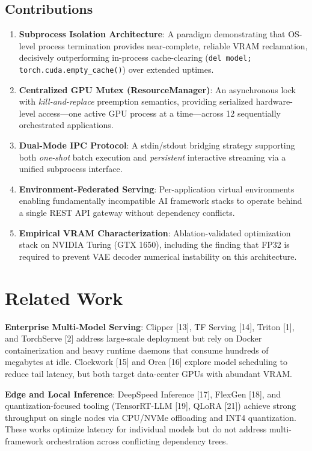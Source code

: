 \documentclass[conference]{IEEEtran}
\begin{document}
\subsection{Contributions}
\begin{enumerate}
    \item \textbf{Subprocess Isolation Architecture}: A paradigm demonstrating that OS-level process termination provides near-complete, reliable VRAM reclamation, decisively outperforming in-process cache-clearing (\texttt{del model; torch.cuda.empty\_cache()}) over extended uptimes.
    \item \textbf{Centralized GPU Mutex (ResourceManager)}: An asynchronous lock with \textit{kill-and-replace} preemption semantics, providing serialized hardware-level access---one active GPU process at a time---across 12 sequentially orchestrated applications.
    \item \textbf{Dual-Mode IPC Protocol}: A stdin/stdout bridging strategy supporting both \textit{one-shot} batch execution and \textit{persistent} interactive streaming via a unified subprocess interface.
    \item \textbf{Environment-Federated Serving}: Per-application virtual environments enabling fundamentally incompatible AI framework stacks to operate behind a single REST API gateway without dependency conflicts.
    \item \textbf{Empirical VRAM Characterization}: Ablation-validated optimization stack on NVIDIA Turing (GTX 1650), including the finding that FP32 is required to prevent VAE decoder numerical instability on this architecture.
\end{enumerate}

\section{Related Work}

\textbf{Enterprise Multi-Model Serving}: Clipper [13], TF Serving [14], Triton [1], and TorchServe [2] address large-scale deployment but rely on Docker containerization and heavy runtime daemons that consume hundreds of megabytes at idle. Clockwork [15] and Orca [16] explore model scheduling to reduce tail latency, but both target data-center GPUs with abundant VRAM.

\textbf{Edge and Local Inference}: DeepSpeed Inference [17], FlexGen [18], and quantization-focused tooling (TensorRT-LLM [19], QLoRA [21]) achieve strong throughput on single nodes via CPU/NVMe offloading and INT4 quantization. These works optimize latency for individual models but do not address multi-framework orchestration across conflicting dependency trees.
\end{document}
